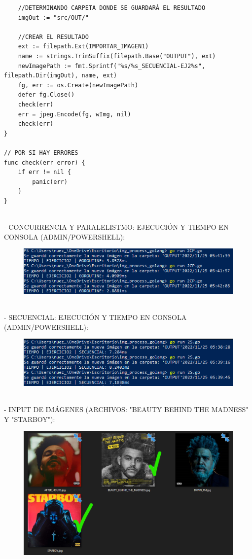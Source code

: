 \documentclass{article}
\begin{document}
\begin{verbatim}
	//DETERMINANDO CARPETA DONDE SE GUARDARÁ EL RESULTADO
	imgOut := "src/OUT/"

	//CREAR EL RESULTADO
	ext := filepath.Ext(IMPORTAR_IMAGEN1)
	name := strings.TrimSuffix(filepath.Base("OUTPUT"), ext)
	newImagePath := fmt.Sprintf("%s/%s_SECUENCIAL-EJ2%s", filepath.Dir(imgOut), name, ext)
	fg, err := os.Create(newImagePath)
	defer fg.Close()
	check(err)
	err = jpeg.Encode(fg, wImg, nil)
	check(err)
}

// POR SI HAY ERRORES
func check(err error) {
	if err != nil {
		panic(err)
	}
}

\end{verbatim}

\\
- CONCURRENCIA Y PARALELISTMO: EJECUCIÓN Y TIEMPO EN CONSOLA (ADMIN/POWERSHELL):
\begin{figure}[h]
\centering
\includegraphics[scale=1]{CON2.png}
\end{figure}
\\
- SECUENCIAL: EJECUCIÓN Y TIEMPO EN CONSOLA (ADMIN/POWERSHELL):
\begin{figure}[h]
\centering
\includegraphics[scale=1]{SEC2.png}
\end{figure}
\\
- INPUT DE IMÁGENES (ARCHIVOS: "BEAUTY BEHIND THE MADNESS" Y "STARBOY"):
\begin{figure}[h]
\centering
\includegraphics[scale=0.4]{IMG2.png}
\end{figure}
\end{document}
